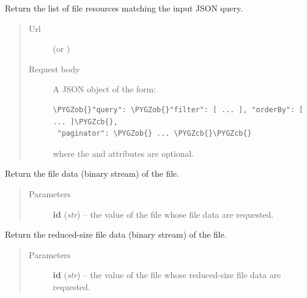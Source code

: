 \documentclass[letterpaper,10pt,english]{sphinxmanual}
\def\PYGZob{\char`\{}
\def\PYGZcb{\char`\}}
\begin{document}
\begin{fulllineitems}
\begin{fulllineitems}
\label{api:onlinelinguisticdatabase.controllers.files.FilesController.search}
Return the list of file resources matching the input JSON query.
\begin{quote}\begin{description}
\item[{Url }] \leavevmode
{} (or )

\item[{Request body}] \leavevmode
A JSON object of the form:

\begin{Verbatim}[commandchars=\\\{\}]
\PYGZob{}"query": \PYGZob{}"filter": [ ... ], "orderBy": [ ... ]\PYGZcb{},
 "paginator": \PYGZob{} ... \PYGZcb{}\PYGZcb{}
\end{Verbatim}

where the  and  attributes are optional.

\end{description}\end{quote}

\end{fulllineitems}


\begin{fulllineitems}
\label{api:onlinelinguisticdatabase.controllers.files.FilesController.serve}
Return the file data (binary stream) of the file.
\begin{quote}\begin{description}
\item[{Parameters}] \leavevmode
\textbf{id} (\emph{str}) -- the  value of the file whose file data are requested.

\end{description}\end{quote}

\end{fulllineitems}


\begin{fulllineitems}
\label{api:onlinelinguisticdatabase.controllers.files.FilesController.serve_reduced}
Return the reduced-size file data (binary stream) of the file.
\begin{quote}\begin{description}
\item[{Parameters}] \leavevmode
\textbf{id} (\emph{str}) -- the  value of the file whose reduced-size file data
are requested.


\end{description}
\end{quote}
\end{fulllineitems}
\end{fulllineitems}
\end{document}
